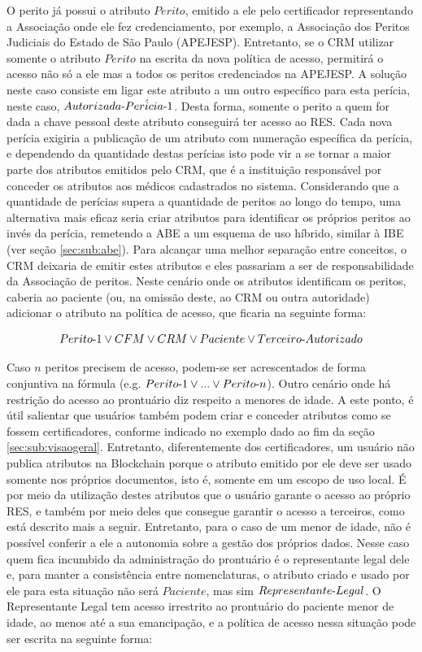 \documentclass[a4paper,11pt]{article}
\begin{document}
O perito já possui o atributo $Perito$, emitido a ele pelo certificador representando a Associação onde ele fez credenciamento, por exemplo, a Associação dos Peritos Judiciais do Estado de São Paulo (APEJESP).
Entretanto, se o CRM utilizar somente o atributo $Perito$ na escrita da nova política de acesso, permitirá o acesso não só a ele mas a todos os peritos credenciados na APEJESP.
A solução neste caso consiste em ligar este atributo a um outro específico para esta perícia, neste caso, $Autorizada\textnormal{-}Per\acute{i}cia\textnormal{-}1$.
Desta forma, somente o perito a quem for dada a chave pessoal deste atributo conseguirá ter acesso ao RES.
Cada nova perícia exigiria a publicação de um atributo com numeração específica da perícia, e dependendo da quantidade destas perícias isto pode vir a se tornar a maior parte dos atributos emitidos pelo CRM, que é a instituição responsável por conceder os atributos aos médicos cadastrados no sistema.
Considerando que a quantidade de perícias supera a quantidade de peritos ao longo do tempo, uma alternativa mais eficaz seria criar atributos para identificar os próprios peritos ao invés da perícia, remetendo a ABE a um esquema de uso híbrido, similar à IBE (ver seção \ref{sec:sub:abe}).
Para alcançar uma melhor separação entre conceitos, o CRM deixaria de emitir estes atributos e eles passariam a ser de responsabilidade da Associação de peritos.
Neste cenário onde os atributos identificam os peritos, caberia ao paciente (ou, na omissão deste, ao CRM ou outra autoridade) adicionar o atributo na política de acesso, que ficaria na seguinte forma:

\[ Perito\textnormal{-}1 \vee CFM \vee CRM \vee Paciente \vee Terceiro\textnormal{-}Autorizado \]

Caso $n$ peritos precisem de acesso, podem-se ser acrescentados de forma conjuntiva na fórmula (e.g. $Perito\textnormal{-}1 \vee ... \vee Perito\textnormal{-}n$).
Outro cenário onde há restrição do acesso ao prontuário diz respeito a menores de idade.
A este ponto, é útil salientar que usuários também podem criar e conceder atributos como se fossem certificadores, conforme indicado no exemplo dado ao fim da seção \ref{sec:sub:visaogeral}.
Entretanto, diferentemente dos certificadores, um usuário não publica atributos na Blockchain porque o atributo emitido por ele deve ser usado somente nos próprios documentos, isto é, somente em um escopo de uso local.
É por meio da utilização destes atributos que o usuário garante o acesso ao próprio RES, e também por meio deles que consegue garantir o acesso a terceiros, como está descrito mais a seguir.
Entretanto, para o caso de um menor de idade, não é possível conferir a ele a autonomia sobre a gestão dos próprios dados.
Nesse caso quem fica incumbido da administração do prontuário é o representante legal dele e, para manter a consistência entre nomenclaturas, o atributo criado e usado por ele para esta situação não será $Paciente$, mas sim $Representante\textnormal{-}Legal$. %
O Representante Legal tem acesso irrestrito ao prontuário do paciente menor de idade, ao menos até a sua emancipação, e a política de acesso nessa situação pode ser escrita na seguinte forma:
\end{document}
